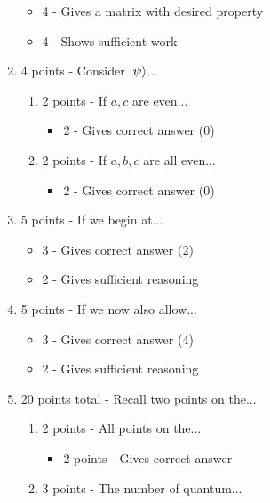 \documentclass[12pt]{article}
\begin{document}
\begin{enumerate}[font=\bfseries]
        \begin{itemize}
            \item 4 - Gives a matrix with desired property
            \item 4 - Shows sufficient work
        \end{itemize}
    \item 4 points - Consider $\ket{\psi}$...
        \begin{enumerate}
            \item 2 points - If $a,c$ are even...
                \begin{itemize}
                    \item 2 - Gives correct answer (0)
                \end{itemize}
            \item 2 points - If $a,b,c$ are all even...
                \begin{itemize}
                    \item 2 - Gives correct answer (0)
                \end{itemize}
        \end{enumerate}
    \item 5 points - If we begin at...
        \begin{itemize}
            \item 3 - Gives correct answer (2)
            \item 2 - Gives sufficient reasoning
        \end{itemize}
    \item 5 points - If we now also allow...
        \begin{itemize}
            \item 3 - Gives correct answer (4)
            \item 2 - Gives sufficient reasoning
        \end{itemize}
    \item 20 points total - Recall two points on the...
        \begin{enumerate}
            \item 2 points - All points on the...
                \begin{itemize}
                    \item 2 points - Gives correct answer 
                \end{itemize}
            \item 3 points - The number of quantum...
                \begin{itemize}

\end{itemize}
\end{enumerate}
\end{enumerate}
\end{document}

